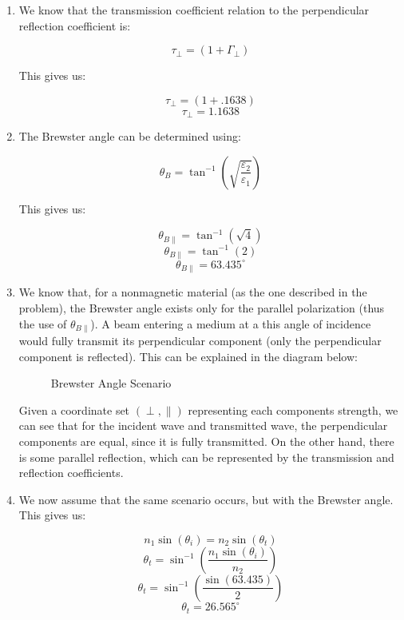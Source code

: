 \begin{enumerate}
\begin{enumerate}
      \item 

        We know that the transmission coefficient relation to the perpendicular reflection coefficient is:

        $$\tau_{\perp}=(1+\Gamma_{\perp})$$

        This gives us:

        $$\tau_{\perp}=(1+.1638)$$
        $$\boxed{\tau_{\perp}=1.1638}$$

      \item 

        The Brewster angle can be determined using:

        $$\theta_B=\tan^{-1}\left( \sqrt{\frac{\varepsilon_2}{\varepsilon_1}} \right)$$

        This gives us:

        $$\theta_{B\parallel}=\tan^{-1}\left( \sqrt{4} \right)$$
        $$\theta_{B\parallel}=\tan^{-1}\left( 2\right)$$
        $$\boxed{\theta_{B\parallel}=63.435^{\circ}}$$

      \item 

        We know that, for a nonmagnetic material (as the one described in the problem), the Brewster angle exists only for the parallel polarization (thus the use of $\theta_{B\parallel}$). A beam entering a medium at a this angle of incidence would fully transmit its perpendicular component (only the perpendicular component is reflected). This can be explained in the diagram below:

        \begin{figure}[h]
          \centering
          
          \caption{Brewster Angle Scenario}
          \label{fig:1}
        \end{figure}

        Given a coordinate set $(\perp,\parallel)$ representing each components strength, we can see that for the incident wave and transmitted wave, the perpendicular components are equal, since it is fully transmitted. On the other hand, there is some parallel reflection, which can be represented by the transmission and reflection coefficients.

      \item 

        We now assume that the same scenario occurs, but with the Brewster angle. This gives us:

        $$n_1\sin(\theta_i)=n_2\sin(\theta_t)$$
        $$\theta_t=\sin^{-1}\left(\frac{n_1\sin(\theta_i)}{n_2}\right)$$
        $$\theta_t=\sin^{-1}\left(\frac{\sin(63.435)}{2}\right)$$
        $$\boxed{\theta_t=26.565^{\circ}}$$


\end{enumerate}
\end{enumerate}
